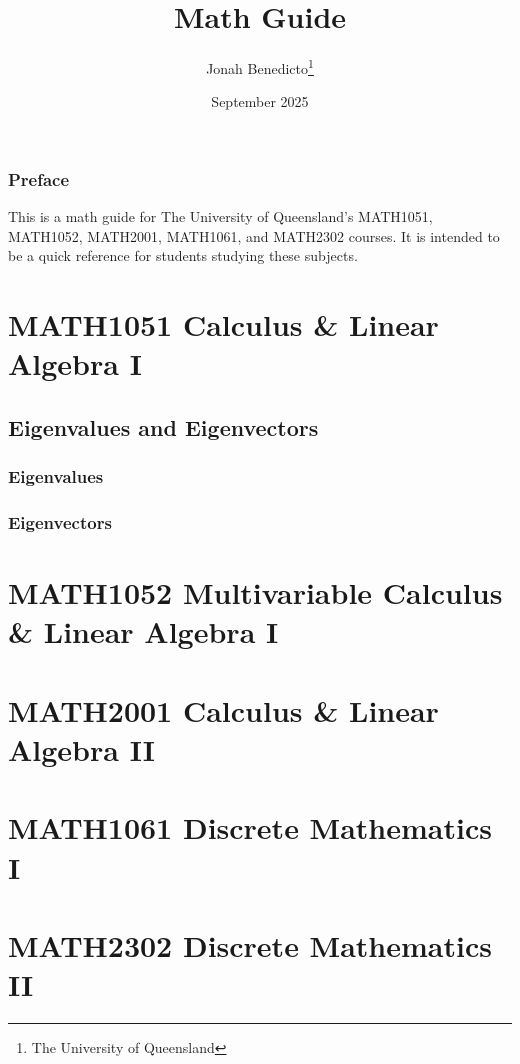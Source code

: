 \documentclass[12pt, letterpaper]{book}
\title{Math Guide}
\author{Jonah Benedicto\thanks{The University of Queensland}}
\date{September 2025}
\begin{document}
\maketitle

\tableofcontents

\newpage

\section*{Preface}
This is a math guide for The University of Queensland's MATH1051, MATH1052, MATH2001, MATH1061, and MATH2302 courses. It is intended to be a quick reference for students studying these subjects.

\part{MATH1051 Calculus \& Linear Algebra I}

\chapter{Eigenvalues and Eigenvectors}

\section{Eigenvalues}

\section{Eigenvectors}

\part{MATH1052 Multivariable Calculus \& Linear Algebra I}

\part{MATH2001 Calculus \& Linear Algebra II}

\part{MATH1061 Discrete Mathematics I}

\part{MATH2302 Discrete Mathematics II}
\end{document}
